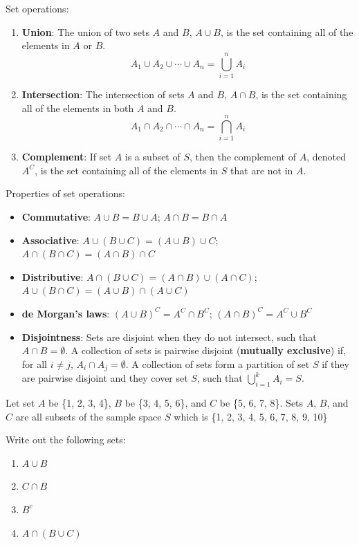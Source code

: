 \documentclass[
]{book}
\begin{document}
Set operations:

\begin{enumerate}
\def\labelenumi{\arabic{enumi}.}
\tightlist
\item
  \textbf{Union}: The union of two sets \(A\) and \(B\), \(A \cup B\), is the set containing all of the elements in \(A\) or \(B\). \[A_1 \cup A_2  \cup \cdots \cup A_n = \bigcup_{i=1}^n A_i\]
\item
  \textbf{Intersection}: The intersection of sets \(A\) and \(B\), \(A \cap B\), is the set containing all of the elements in both \(A\) and \(B\). \[A_1 \cap A_2  \cap \cdots \cap A_n = \bigcap_{i=1}^n A_i\]
\item
  \textbf{Complement}: If set \(A\) is a subset of \(S\), then the complement of \(A\), denoted \(A^C\), is the set containing all of the elements in \(S\) that are not in \(A\).
\end{enumerate}

Properties of set operations:

\begin{itemize}
\tightlist
\item
  \textbf{Commutative}: \(A \cup B = B \cup A\); \(A \cap B = B \cap A\)
\item
  \textbf{Associative}: \(A \cup (B \cup C) = (A \cup B) \cup C\); \(A \cap (B \cap C) = (A \cap B) \cap C\)
\item
  \textbf{Distributive}: \(A \cap (B \cup C) = (A \cap B) \cup (A \cap C)\); \(A \cup (B \cap C) = (A \cup B) \cap (A \cup C)\)
\item
  \textbf{de Morgan's laws}: \((A \cup B)^C = A^C \cap B^C\); \((A \cap B)^C = A^C \cup B^C\)
\item
  \textbf{Disjointness}: Sets are disjoint when they do not intersect, such that \(A \cap B = \emptyset\). A collection of sets is pairwise disjoint (\textbf{mutually exclusive}) if, for all \(i \neq j\), \(A_i \cap A_j = \emptyset\). A collection of sets form a partition of set \(S\) if they are pairwise disjoint and they cover set \(S\), such that \(\bigcup_{i = 1}^k A_i = S\).
\end{itemize}

\begin{example}[Sets]
\protect\hypertarget{exm:sets}{}\label{exm:sets}

Let set \(A\) be \{1, 2, 3, 4\}, \(B\) be \{3, 4, 5, 6\}, and \(C\) be \{5, 6, 7, 8\}. Sets \(A\), \(B\), and \(C\) are all subsets of the sample space \(S\) which is \{1, 2, 3, 4, 5, 6, 7, 8, 9, 10\}

Write out the following sets:

\begin{enumerate}
\def\labelenumi{\arabic{enumi}.}
\tightlist
\item
  \(A \cup B\)
\item
  \(C \cap B\)
\item
  \(B^c\)
\item
  \(A \cap (B \cup C)\)
\end{enumerate}

\end{example}
\end{document}
